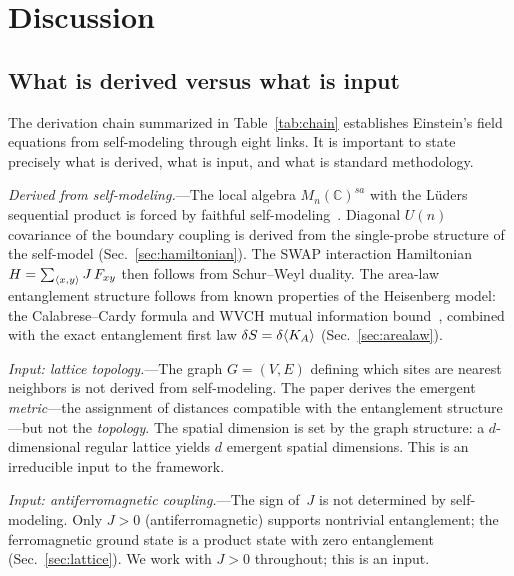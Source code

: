 \section{Discussion}
\label{sec:discussion}

\subsection{What is derived versus what is input}
\label{sec:derived-vs-input}

The derivation chain summarized in Table~\ref{tab:chain} establishes
Einstein's field equations from self-modeling through eight links.  It is
important to state precisely what is derived, what is input, and what is
standard methodology.

\emph{Derived from self-modeling.}---The local algebra
$M_n(\mathbb{C})^{sa}$ with the L\"uders sequential product is forced by
faithful self-modeling~\cite{Paper5}. Diagonal $U(n)$ covariance of the
boundary coupling is derived from the single-probe structure of the
self-model (Sec.~\ref{sec:hamiltonian}).  The SWAP interaction
Hamiltonian $H = \sum_{\langle x,y\rangle} J\,F_{xy}$ then follows from
Schur--Weyl duality.  The area-law entanglement structure follows from
known properties of the Heisenberg model: the Calabrese--Cardy formula
and WVCH mutual information bound~\cite{WVCH2008}, combined with the
exact entanglement first law
$\delta S = \delta\langle K_A\rangle$
(Sec.~\ref{sec:arealaw}).

\emph{Input: lattice topology.}---The graph $G = (V, E)$ defining which
sites are nearest neighbors is not derived from self-modeling.  The paper
derives the emergent \emph{metric}---the assignment of distances
compatible with the entanglement structure---but not the
\emph{topology}.  The spatial dimension is set by the graph structure:
a $d$-dimensional regular lattice yields $d$ emergent spatial dimensions.
This is an irreducible input to the framework.

\emph{Input: antiferromagnetic coupling.}---The sign of~$J$ is not
determined by self-modeling.  Only $J > 0$ (antiferromagnetic) supports
nontrivial entanglement; the ferromagnetic ground state is a product
state with zero entanglement (Sec.~\ref{sec:lattice}).  We work with
$J > 0$ throughout; this is an input.

